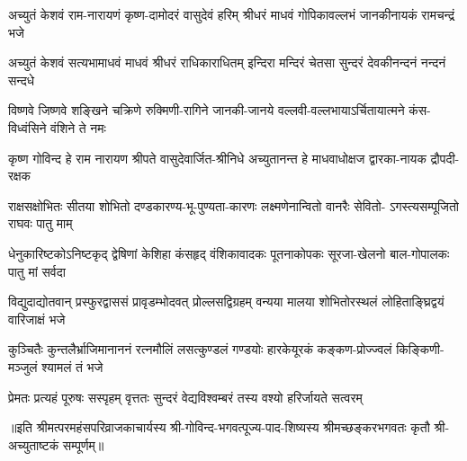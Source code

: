 

\fourlineindentedshloka
{अच्युतं केशवं राम-नारायणं}
{कृष्ण-दामोदरं वासुदेवं हरिम्}
{श्रीधरं माधवं गोपिकावल्लभं}
{जानकीनायकं रामचन्द्रं भजे}

\fourlineindentedshloka
{अच्युतं केशवं सत्यभामाधवं}
{माधवं श्रीधरं राधिकाराधितम्}
{इन्दिरा मन्दिरं चेतसा सुन्दरं}
{देवकीनन्दनं नन्दनं सन्दधे}

\fourlineindentedshloka
{विष्णवे जिष्णवे शङ्खिने चक्रिणे}
{रुक्मिणी-रागिने जानकी-जानये}
{वल्लवी-वल्लभायाऽर्चितायात्मने}
{कंस-विध्वंसिने वंशिने ते नमः}

\fourlineindentedshloka
{कृष्ण गोविन्द हे राम नारायण}
{श्रीपते वासुदेवार्जित-श्रीनिधे}
{अच्युतानन्त हे माधवाधोक्षज}
{द्वारका-नायक द्रौपदी-रक्षक}

\fourlineindentedshloka
{राक्षसक्षोभितः सीतया शोभितो}
{दण्डकारण्य-भू-पुण्यता-कारणः}
{लक्ष्मणेनान्वितो वानरैः सेवितो-}
{ऽगस्त्यसम्पूजितो राघवः पातु माम्}

\fourlineindentedshloka
{धेनुकारिष्टकोऽनिष्टकृद् द्वेषिणां}
{केशिहा कंसहृद् वंशिकावादकः}
{पूतनाकोपकः सूरजा-खेलनो}
{बाल-गोपालकः पातु मां सर्वदा}

\fourlineindentedshloka
{विद्युदाद्योतवान् प्रस्फुरद्वाससं}
{प्रावृडम्भोदवत् प्रोल्लसद्विग्रहम्}
{वन्यया मालया शोभितोरस्थलं}
{लोहिताङ्घ्रिद्वयं वारिजाक्षं भजे}

\fourlineindentedshloka
{कुञ्चितैः कुन्तलैर्भ्राजिमानाननं}
{रत्नमौलिं लसत्कुण्डलं गण्डयोः}
{हारकेयूरकं कङ्कण-प्रोज्ज्वलं}
{किङ्किणी-मञ्जुलं श्यामलं तं भजे}

{प्रेमतः प्रत्यहं पूरुषः सस्पृहम्}
{वृत्ततः सुन्दरं वेद्यविश्वम्बरं}
{तस्य वश्यो हरिर्जायते सत्वरम्}

॥इति श्रीमत्परमहंसपरिव्राजकाचार्यस्य श्री-गोविन्द-भगवत्पूज्य-पाद-शिष्यस्य
श्रीमच्छङ्करभगवतः कृतौ श्री-अच्युताष्टकं सम्पूर्णम्॥